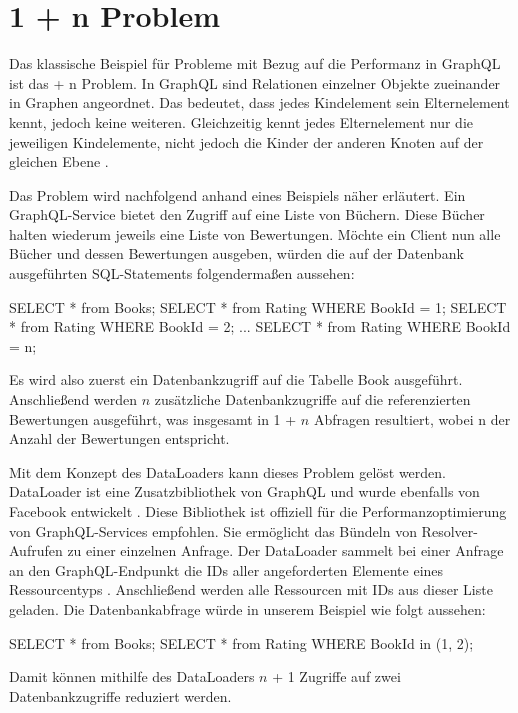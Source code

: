 \section{1 + n Problem}
Das klassische Beispiel für Probleme mit Bezug auf die Performanz in GraphQL ist das  + n Problem\grqq{}.
In GraphQL sind Relationen einzelner Objekte zueinander in Graphen angeordnet.
Das bedeutet, dass jedes Kindelement sein Elternelement kennt, jedoch keine weiteren.
Gleichzeitig kennt jedes Elternelement nur die jeweiligen Kindelemente, nicht jedoch die Kinder der anderen Knoten auf der gleichen Ebene \parencite[S. 104-105]{kress2020graphql}.
\newline

Das Problem wird nachfolgend anhand eines Beispiels näher erläutert.
Ein GraphQL-Service bietet den Zugriff auf eine Liste von Büchern.
Diese Bücher halten wiederum jeweils eine Liste von Bewertungen.
Möchte ein Client nun alle Bücher und dessen Bewertungen ausgeben, würden die auf der Datenbank ausgeführten SQL-Statements folgendermaßen aussehen:
\begin{JsCode}
SELECT * from Books;
SELECT * from Rating WHERE BookId = 1;
SELECT * from Rating WHERE BookId = 2;
...
SELECT * from Rating WHERE BookId = n;
\end{JsCode}

Es wird also zuerst ein Datenbankzugriff auf die Tabelle Book ausgeführt.
Anschließend werden $n$ zusätzliche Datenbankzugriffe auf die referenzierten Bewertungen ausgeführt, was insgesamt in 1 + $n$ Abfragen resultiert, wobei n der Anzahl der Bewertungen entspricht.

Mit dem Konzept des \glqq DataLoaders\grqq{} kann dieses Problem gelöst werden.
DataLoader ist eine Zusatzbibliothek von GraphQL und wurde ebenfalls von Facebook entwickelt \parencite[S. 105]{kress2020graphql}.
Diese Bibliothek ist offiziell für die Performanzoptimierung von GraphQL-Services empfohlen.
Sie ermöglicht das Bündeln von Resolver-Aufrufen zu einer einzelnen Anfrage.
Der DataLoader sammelt bei einer Anfrage an den GraphQL-Endpunkt die IDs aller angeforderten Elemente eines Ressourcentyps \parencite[S. 105]{kress2020graphql}.
Anschließend werden alle Ressourcen mit IDs aus dieser Liste geladen.
Die Datenbankabfrage würde in unserem Beispiel wie folgt aussehen:

\begin{JsCode}
SELECT * from Books;
SELECT * from Rating WHERE BookId in (1, 2);
\end{JsCode}
Damit können mithilfe des DataLoaders $n$ + 1 Zugriffe auf zwei Datenbankzugriffe reduziert werden.
